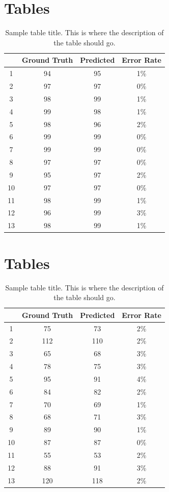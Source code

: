 \documentclass{bmcart}
\begin{document}
\section*{Tables}
\begin{table}[h!]
\caption{Sample table title. This is where the description of the table should go.}
      \begin{tabular}{cccc}
        \hline
           & Ground Truth  & Predicted & Error Rate\\ \hline
        1 & 94 & 95 & 1\%\\
        2 & 97 & 97 & 0\%\\
        3 & 98 & 99 & 1\%\\
        4 & 99 & 98 & 1\%\\
        5 & 98 & 96 & 2\%\\
        6 & 99 & 99 & 0\%\\
        7 & 99 & 99 & 0\%\\
        8 & 97 & 97 & 0\%\\
        9 & 95 & 97 & 2\%\\
        10& 97 & 97 & 0\%\\
        11& 98 & 99 & 1\%\\
        12& 96 & 99 & 3\%\\
        13& 98 & 99 & 1\%\\ \hline
      \end{tabular}
\end{table}
\section*{Tables}
\begin{table}[h!]
\caption{Sample table title. This is where the description of the table should go.}
      \begin{tabular}{cccc}
        \hline
           & Ground Truth  & Predicted & Error Rate\\ \hline
        1 & 75 & 73  & 2\%\\
        2 & 112& 110 & 2\%\\
        3 & 65 & 68  & 3\%\\
        4 & 78 & 75  & 3\%\\
        5 & 95 & 91  & 4\%\\
        6 & 84 & 82  & 2\%\\
        7 & 70 & 69  & 1\%\\
        8 & 68 & 71  & 3\%\\
        9 & 89 & 90  & 1\%\\
        10& 87 & 87  & 0\%\\
        11& 55 & 53  & 2\%\\
        12& 88 & 91  & 3\%\\
        13& 120& 118 & 2\%\\ \hline
      \end{tabular}
\end{table}
\end{document}
